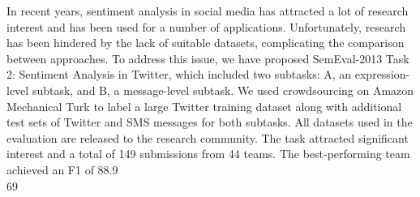 In recent years, sentiment analysis in social media has attracted a lot of research interest
 and has been used for a number of applications.
 Unfortunately, research has been hindered
 by the lack of suitable datasets, complicating
 the comparison between approaches.
 To address this issue, we have proposed
 SemEval-2013 Task 2: Sentiment Analysis in
 Twitter, which included two subtasks: A, an
 expression-level subtask, and B, a message-level
 subtask. We used crowdsourcing on
 Amazon Mechanical Turk to label a large
 Twitter training dataset along with additional
 test sets of Twitter and SMS messages for both
 subtasks. All datasets used in the evaluation
 are released to the research community. The
 task attracted significant interest and a total
 of 149 submissions from 44 teams. The best-performing
 team achieved an F1 of 88.9\\%
 69\\%

